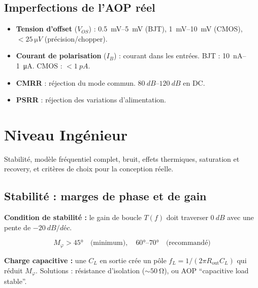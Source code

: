 \documentclass[12pt,a4paper,twoside]{book}
\begin{document}
\subsection{Imperfections de l'AOP réel}

\begin{formule}
\begin{itemize}[nosep]
\item \textbf{Tension d'offset} ($V_{OS}$) : \SI{0.5}{mV}--\SI{5}{mV} (BJT), \SI{1}{mV}--\SI{10}{mV} (CMOS), $< \SI{25}{\micro V}$ (précision/chopper).
\item \textbf{Courant de polarisation} ($I_B$) : courant dans les entrées. BJT : \SI{10}{nA}--\SI{1}{\micro A}. CMOS : $< \SI{1}{pA}$.
\item \textbf{CMRR} : réjection du mode commun. $\SI{80}{dB}$--$\SI{120}{dB}$ en DC.
\item \textbf{PSRR} : réjection des variations d'alimentation.
\end{itemize}
\end{formule}

\section{Niveau Ingénieur}

\begin{ingenieur}
Stabilité, modèle fréquentiel complet, bruit, effets thermiques, saturation et recovery, et critères de choix pour la conception réelle.
\end{ingenieur}

\subsection{Stabilité : marges de phase et de gain}

\begin{formule}
\textbf{Condition de stabilité :} le gain de boucle $T(f)$ doit traverser $\SI{0}{dB}$ avec une pente de $-\SI{20}{dB/déc}$.

\[
\boxed{M_\varphi > 45° \quad \text{(minimum)}, \quad 60°\text{--}70° \quad \text{(recommandé)}}
\]

\textbf{Charge capacitive :} une $C_L$ en sortie crée un pôle $f_L = 1/(2\pi R_{\text{out}} C_L)$ qui réduit $M_\varphi$. Solutions : résistance d'isolation ($\sim\SI{50}{\ohm}$), ou AOP ``capacitive load stable''.
\end{formule}
\end{document}
